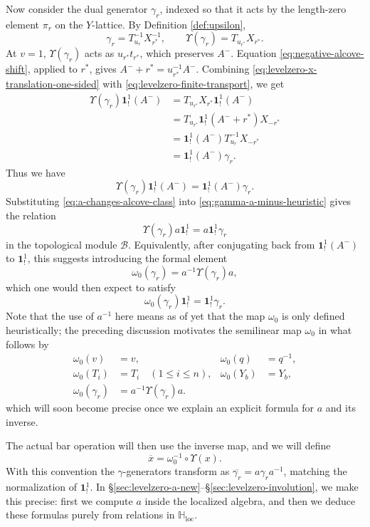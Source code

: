 \documentclass{amsart}
\newcommand{\bone}{\mathbf{1}}
\theoremstyle{definition}
\numberwithin{equation}{section}
\begin{document}
Now consider the dual generator $\gamma_r$, indexed so that it acts by the
length-zero element $\pi_r$ on the \(Y\)-lattice. By Definition
\ref{def:upsilon},
\[
\gamma_r=T_{u_r}^{-1}X_{r^*}^{-1},
\qquad
\Upsilon(\gamma_r)=T_{u_{r^*}}X_{r^*} .
\]
At \(v=1\), \(\Upsilon(\gamma_r)\) acts as
\(u_{r^*}t_{r^*}\), which preserves \(A^-\). Equation
\eqref{eq:negative-alcove-shift}, applied to \(r^*\), gives
\(A^-+r^*=u_{r^*}^{-1}A^-\). Combining
\eqref{eq:levelzero-x-translation-one-sided} with
\eqref{eq:levelzero-finite-transport}, we get
\[
\begin{aligned}
\Upsilon(\gamma_r)\bone_!^1(A^-)
&=T_{u_{r^*}}X_{r^*}\bone_!^1(A^-)\\
&=T_{u_{r^*}}\bone_!^1(A^-+r^*)X_{-r^*}\\
&=\bone_!^1(A^-)T_{u_r}^{-1}X_{-r^*}\\
&=\bone_!^1(A^-)\gamma_r .
\end{aligned}
\]
Thus we have
\begin{equation}\label{eq:gamma-a-minus-heuristic}
\Upsilon(\gamma_r)\bone_!^1(A^-)=\bone_!^1(A^-)\gamma_r.
\end{equation}
Substituting \eqref{eq:a-changes-alcove-class} into
\eqref{eq:gamma-a-minus-heuristic} gives the relation
\[
\Upsilon(\gamma_r)a\bone_!^1=a\bone_!^1\gamma_r
\]
in the topological module $\mathcal{B}$. Equivalently, after conjugating back from
\(\bone_!^1(A^-)\) to \(\bone_!^1\), this suggests introducing the  formal element
\begin{equation}
\omega_0(\gamma_r) = a^{-1} \Upsilon(\gamma_r) a,
\end{equation}
which one would then expect to satisfy
\begin{equation}
    \omega_0(\gamma_r)\bone_!^1 = \bone_!^1\gamma_r.
\end{equation}
Note that the use of $a^{-1}$ here means as of yet that the map $\omega_0$ is only defined heuristically; the preceding discussion motivates the semilinear map $\omega_0$ in what follows by
\[
\begin{aligned}
\omega_0(v)&=v, & \omega_0(q)&=q^{-1},\\
\omega_0(T_i)&=T_i\quad(1\leqslant i\leqslant n), & \omega_0(Y_b)&=Y_b,\\
\omega_0(\gamma_r)&=a^{-1}\Upsilon(\gamma_r)a.
\end{aligned}
\]
which will soon become precise once we explain an explicit formula for $a$ and its inverse.

The actual bar operation will then use the inverse map, and we will define
\[
\overline{x}=\omega_0^{-1}\circ\Upsilon(x).
\]
With this convention the \(\gamma\)-generators transform as
\(\overline{\gamma_r}=a\gamma_r a^{-1}\), matching the normalization of
\(\bone_!^1\).
In \S\ref{sec:levelzero-a-new}--\S\ref{sec:levelzero-involution}, we make this precise: first we compute $a$ inside the
localized algebra, and then we deduce these formulas purely from relations in $\mathbb H_{\mathrm{loc}}$.
\end{document}
